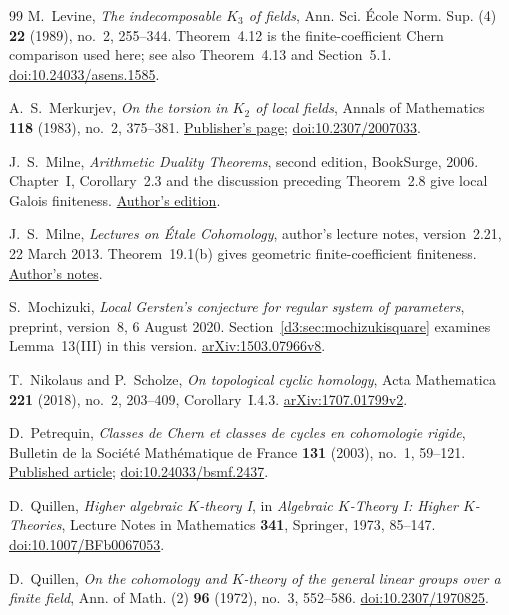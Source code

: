 \documentclass[11pt,a4paper]{amsart}
\numberwithin{equation}{section}
\theoremstyle{definition}
\theoremstyle{remark}
\begin{document}
\begin{thebibliography}{99}
M.~Levine, \emph{The indecomposable $K_3$ of fields}, Ann. Sci. \'Ecole Norm. Sup. (4) \textbf{22} (1989), no.~2, 255--344. Theorem~4.12 is the finite-coefficient Chern comparison used here; see also Theorem~4.13 and Section~5.1.
\href{https://doi.org/10.24033/asens.1585}{doi:10.24033/asens.1585}.

A.~S.~Merkurjev, \emph{On the torsion in $K_2$ of local fields}, Annals of Mathematics \textbf{118} (1983), no.~2, 375--381.
\href{https://annals.math.princeton.edu/1983/118-2/p06}{Publisher's page};
\href{https://doi.org/10.2307/2007033}{doi:10.2307/2007033}.

J.~S.~Milne, \emph{Arithmetic Duality Theorems}, second edition, BookSurge, 2006. Chapter~I, Corollary~2.3 and the discussion preceding Theorem~2.8 give local Galois finiteness.
\href{https://www.jmilne.org/math/Books/ADTnot.pdf}{Author's edition}.

J.~S.~Milne, \emph{Lectures on \'Etale Cohomology}, author's lecture notes, version~2.21, 22 March 2013. Theorem~19.1(b) gives geometric finite-coefficient finiteness.
\href{https://www.jmilne.org/math/CourseNotes/LEC.pdf}{Author's notes}.

S.~Mochizuki, \emph{Local Gersten's conjecture for regular system of parameters}, preprint, version~8, 6 August 2020. Section~\ref{d3:sec:mochizukisquare} examines Lemma~13(III) in this version.
\href{https://arxiv.org/abs/1503.07966v8}{arXiv:1503.07966v8}.

T.~Nikolaus and P.~Scholze, \emph{On topological cyclic homology},
Acta Mathematica \textbf{221} (2018), no.~2, 203--409, Corollary~I.4.3.
\href{https://arxiv.org/abs/1707.01799v2}{arXiv:1707.01799v2}.

D.~Petrequin, \emph{Classes de Chern et classes de cycles en
cohomologie rigide}, Bulletin de la Soci\'et\'e Math\'ematique
de France \textbf{131} (2003), no.~1, 59--121.
\href{https://www.numdam.org/article/BSMF_2003__131_1_59_0.pdf}
{Published article};
\href{https://doi.org/10.24033/bsmf.2437}{doi:10.24033/bsmf.2437}.

D.~Quillen, \emph{Higher algebraic $K$-theory I}, in \emph{Algebraic $K$-Theory I: Higher $K$-Theories}, Lecture Notes in Mathematics \textbf{341}, Springer, 1973, 85--147.
\href{https://doi.org/10.1007/BFb0067053}{doi:10.1007/BFb0067053}.

D.~Quillen, \emph{On the cohomology and \(K\)-theory of the general
linear groups over a finite field}, Ann. of Math. (2)
\textbf{96} (1972), no.~3, 552--586.
\href{https://doi.org/10.2307/1970825}{doi:10.2307/1970825}.


\end{thebibliography}
\end{document}
